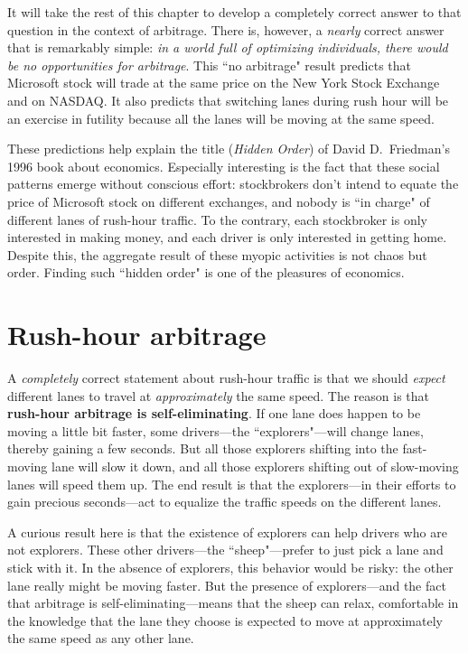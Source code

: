 It will take the rest of this chapter to develop a completely correct answer to that question in the context of arbitrage. There is, however, a \emph{nearly} correct answer that is remarkably simple: \emph{in a world full of optimizing individuals, there would be no opportunities for arbitrage}. This ``no arbitrage" result predicts that Microsoft stock will trade at the same price on the New York Stock Exchange and on NASDAQ. It also predicts that switching lanes during rush hour will be an exercise in futility because all the lanes will be moving at the same speed.

These predictions help explain the title (\emph{Hidden Order}) of David D.\ Friedman's 1996 book about economics. Especially interesting is the fact that these social patterns emerge without conscious effort: stockbrokers don't intend to equate the price of Microsoft stock on different exchanges, and nobody is ``in charge" of different lanes of rush-hour traffic. To the contrary, each stockbroker is only interested in making money, and each driver is only interested in getting home. Despite this, the aggregate result of these myopic activities is not chaos but order. Finding such ``hidden order" is one of the pleasures of economics.



\section{Rush-hour arbitrage}

A \emph{completely} correct statement about rush-hour traffic is that we should \emph{expect} different lanes to travel at \emph{approximately} the same speed. The reason is that \textbf{rush-hour arbitrage is self-eliminating}. If one lane does happen to be moving a little bit faster, some drivers---the ``explorers"---will change lanes, thereby gaining a few seconds. But all those explorers shifting into the fast-moving lane will slow it down, and all those explorers shifting out of slow-moving lanes will speed them up. The end result is that the explorers---in their efforts to gain precious seconds---act to equalize the traffic speeds on the different lanes.

A curious result here is that the existence of explorers can help drivers who are not explorers. These other drivers---the ``sheep"---prefer to just pick a lane and stick with it. In the absence of explorers, this behavior would be risky: the other lane really might be moving faster. But the presence of explorers---and the fact that arbitrage is self-eliminating---means that the sheep can relax, comfortable in the knowledge that the lane they choose is expected to move at approximately the same speed as any other lane.

